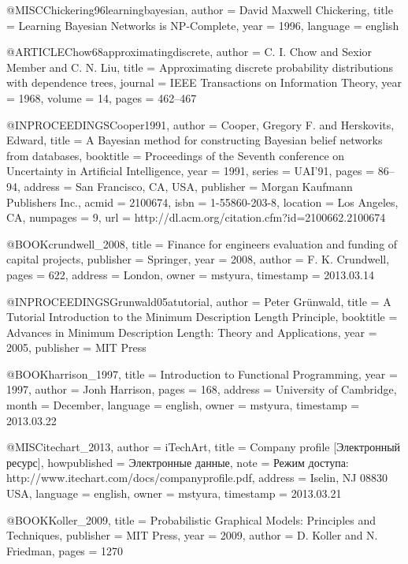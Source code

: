 @MISC{Chickering96learningbayesian,
  author = {David Maxwell Chickering},
  title = {Learning Bayesian Networks is NP-Complete},
  year = {1996},
  language = {english}
}

@ARTICLE{Chow68approximatingdiscrete,
  author = {C. I. Chow and Sexior Member and C. N. Liu},
  title = {Approximating discrete probability distributions with dependence
	trees},
  journal = {IEEE Transactions on Information Theory},
  year = {1968},
  volume = {14},
  pages = {462--467}
}

@INPROCEEDINGS{Cooper1991,
  author = {Cooper, Gregory F. and Herskovits, Edward},
  title = {A Bayesian method for constructing Bayesian belief networks from
	databases},
  booktitle = {Proceedings of the Seventh conference on Uncertainty in Artificial
	Intelligence},
  year = {1991},
  series = {UAI'91},
  pages = {86--94},
  address = {San Francisco, CA, USA},
  publisher = {Morgan Kaufmann Publishers Inc.},
  acmid = {2100674},
  isbn = {1-55860-203-8},
  location = {Los Angeles, CA},
  numpages = {9},
  url = {http://dl.acm.org/citation.cfm?id=2100662.2100674}
}

@BOOK{crundwell_2008,
  title = {Finance for engineers evaluation and funding of capital projects},
  publisher = {Springer},
  year = {2008},
  author = {F. K. Crundwell},
  pages = {622},
  address = {London},
  owner = {mstyura},
  timestamp = {2013.03.14}
}

@INPROCEEDINGS{Grunwald05atutorial,
  author = {Peter Grünwald},
  title = {A Tutorial Introduction to the Minimum Description Length Principle},
  booktitle = {Advances in Minimum Description Length: Theory and Applications},
  year = {2005},
  publisher = {MIT Press}
}

@BOOK{harrison_1997,
  title = {Introduction to Functional Programming},
  year = {1997},
  author = {Jonh Harrison},
  pages = {168},
  address = {University of Cambridge},
  month = {December},
  language = {english},
  owner = {mstyura},
  timestamp = {2013.03.22}
}

@MISC{itechart_2013,
  author = {iTechArt},
  title = {Company profile [Электронный ресурс]},
  howpublished = {Электронные данные},
  note = {Режим доступа: http://www.itechart.com/docs/companyprofile.pdf},
  address = {Iselin, NJ 08830 USA},
  language = {english},
  owner = {mstyura},
  timestamp = {2013.03.21}
}

@BOOK{Koller_2009,
  title = {Probabilistic Graphical Models: Principles and Techniques},
  publisher = {MIT Press},
  year = {2009},
  author = {D. Koller and N. Friedman},
  pages = {1270}
}

